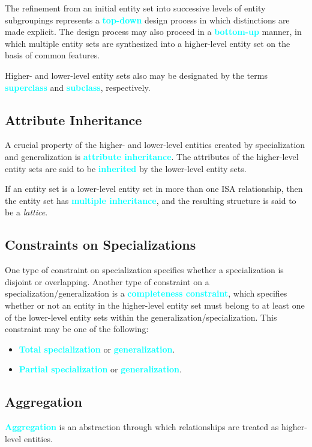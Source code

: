 \documentclass[a4paper,12pt,twoside,openany]{book}
\newcommand{\textcy}[1]{\textbf{\textcolor{cyan}{#1}}}
\begin{document}
The refinement from an initial entity set into successive levels of entity subgroupings represents a \textcy{top-down} design process in which distinctions are made explicit. The design process may also proceed in a \textcy{bottom-up} manner, in which multiple entity sets are synthesized into a higher-level entity set on the basis of common features.

Higher- and lower-level entity sets also may be designated by the terms \textcy{superclass} and \textcy{subclass}, respectively.

\subsection{Attribute Inheritance}

A crucial property of the higher- and lower-level entities created by specialization and generalization is \textcy{attribute inheritance}. The attributes of the higher-level entity sets are said to be \textcy{inherited} by the lower-level entity sets.

If an entity set is a lower-level entity set in more than one ISA relationship, then the entity set has \textcy{multiple inheritance}, and the resulting structure is said to be a \textit{lattice}.

\subsection{Constraints on Specializations}

One type of constraint on specialization specifies whether a specialization is disjoint or overlapping. Another type of constraint on a specialization/generalization is a \textcy{completeness constraint}, which specifies whether or not an entity in the higher-level entity set must belong to at least one of the lower-level entity sets within the generalization/specialization. This constraint may be one of the following:
\begin{itemize}
    \item \textcy{Total specialization} or \textcy{generalization}.
    \item \textcy{Partial specialization} or \textcy{generalization}.
\end{itemize}

\subsection{Aggregation}

\textcy{Aggregation} is an abstraction through which relationships are treated as higher-level entities.
\end{document}
